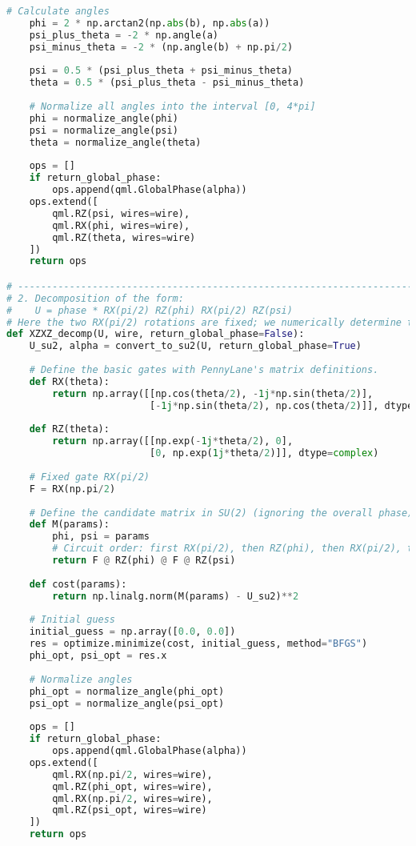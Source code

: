\documentclass[12pt,twoside]{report}  %
\begin{document}
\begin{lstlisting}[language=Python, caption={Python code for one_qubit_decomposition.}]
    # Calculate angles
    phi = 2 * np.arctan2(np.abs(b), np.abs(a))
    psi_plus_theta = -2 * np.angle(a)
    psi_minus_theta = -2 * (np.angle(b) + np.pi/2)
    
    psi = 0.5 * (psi_plus_theta + psi_minus_theta)
    theta = 0.5 * (psi_plus_theta - psi_minus_theta)
    
    # Normalize all angles into the interval [0, 4*pi]
    phi = normalize_angle(phi)
    psi = normalize_angle(psi)
    theta = normalize_angle(theta)
    
    ops = []
    if return_global_phase:
        ops.append(qml.GlobalPhase(alpha))
    ops.extend([
        qml.RZ(psi, wires=wire),
        qml.RX(phi, wires=wire),
        qml.RZ(theta, wires=wire)
    ])
    return ops

# -----------------------------------------------------------------------------
# 2. Decomposition of the form:
#    U = phase * RX(pi/2) RZ(phi) RX(pi/2) RZ(psi)
# Here the two RX(pi/2) rotations are fixed; we numerically determine the free angles phi and psi.
def XZXZ_decomp(U, wire, return_global_phase=False):
    U_su2, alpha = convert_to_su2(U, return_global_phase=True)
    
    # Define the basic gates with PennyLane's matrix definitions.
    def RX(theta):
        return np.array([[np.cos(theta/2), -1j*np.sin(theta/2)],
                         [-1j*np.sin(theta/2), np.cos(theta/2)]], dtype=complex)
    
    def RZ(theta):
        return np.array([[np.exp(-1j*theta/2), 0],
                         [0, np.exp(1j*theta/2)]], dtype=complex)
    
    # Fixed gate RX(pi/2)
    F = RX(np.pi/2)
    
    # Define the candidate matrix in SU(2) (ignoring the overall phase)
    def M(params):
        phi, psi = params
        # Circuit order: first RX(pi/2), then RZ(phi), then RX(pi/2), then RZ(psi)
        return F @ RZ(phi) @ F @ RZ(psi)
    
    def cost(params):
        return np.linalg.norm(M(params) - U_su2)**2
    
    # Initial guess
    initial_guess = np.array([0.0, 0.0])
    res = optimize.minimize(cost, initial_guess, method="BFGS")
    phi_opt, psi_opt = res.x
    
    # Normalize angles
    phi_opt = normalize_angle(phi_opt)
    psi_opt = normalize_angle(psi_opt)
    
    ops = []
    if return_global_phase:
        ops.append(qml.GlobalPhase(alpha))
    ops.extend([
        qml.RX(np.pi/2, wires=wire),
        qml.RZ(phi_opt, wires=wire),
        qml.RX(np.pi/2, wires=wire),
        qml.RZ(psi_opt, wires=wire)
    ])
    return ops


\end{lstlisting}
\end{document}
